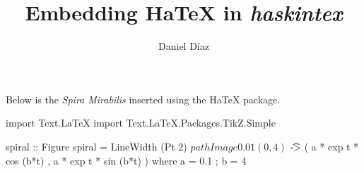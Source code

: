 \documentclass{article}
\author{Daniel Díaz}
\title{Embedding HaTeX in \emph{haskintex}}
\begin{document}
\maketitle
Below is the \emph{Spira Mirabilis} inserted using the HaTeX
package.
\begin{writehaskell}
import Text.LaTeX
import Text.LaTeX.Packages.TikZ.Simple

spiral :: Figure
spiral = LineWidth (Pt 2) $
    pathImage 0.01 (0,4) $
      \t -> ( a * exp t * cos (b*t)
            , a * exp t * sin (b*t)
              )
  where
    a = 0.1 ; b = 4
\end{writehaskell}
\end{document}
